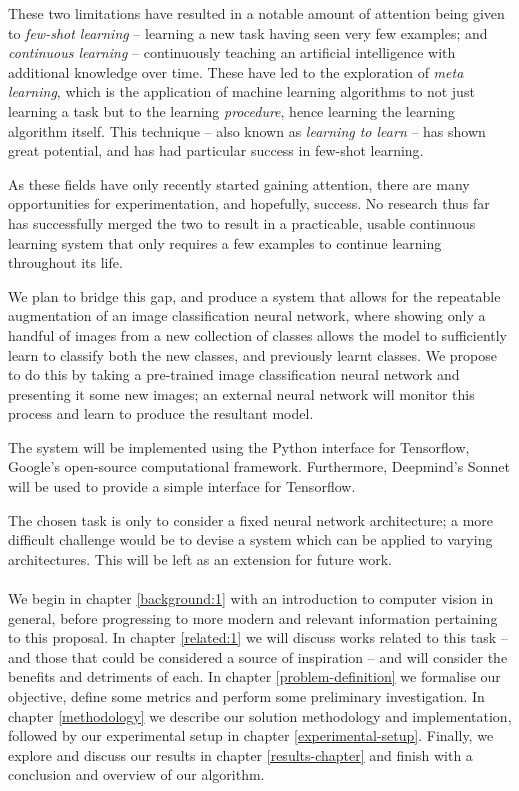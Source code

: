 \documentclass{report}
\begin{document}
These two limitations have resulted in a notable amount of attention being given to \emph{few-shot learning}\parencite{maml}\parencite{relationnet} -- learning a new task having seen very few examples; and  \emph{continuous learning}\parencite{lwf}\parencite{ewc}\parencite{hat} -- continuously teaching an artificial intelligence with additional knowledge over time. These have led to the exploration of \emph{meta learning}\parencite{lotsag}\parencite{maml}\parencite{reptile}\parencite{mlwtc}, which is the application of machine learning algorithms to not just learning a task but to the learning \emph{procedure}, hence learning the learning algorithm itself. This technique -- also known as \emph{learning to learn} -- has shown great potential, and has had particular success in few-shot learning\parencite{maml}\parencite{matching}\parencite{mlwtc}. \par
As these fields have only recently started gaining attention, there are many opportunities for experimentation, and hopefully, success. No research thus far has successfully merged the two to result in a practicable, usable continuous learning system that only requires a few examples to continue learning throughout its life. \par
We plan to bridge this gap, and produce a system that allows for the repeatable augmentation of an image classification neural network, where showing only a handful of images from a new collection of classes allows the model to sufficiently learn to classify both the new classes, and previously learnt classes. We propose to do this by taking a pre-trained image classification neural network and presenting it some new images; an external neural network will monitor this process and learn to produce the resultant model. \par
The system will be implemented using the Python interface for Tensorflow\parencite{tensorflow}, Google's open-source computational framework. Furthermore, Deepmind's Sonnet\parencite{sonnet} will be used to provide a simple interface for Tensorflow. \par
The chosen task is only to consider a fixed neural network architecture; a more difficult challenge would be to devise a system which can be applied to varying architectures. This will be left as an extension for future work. \\ \\
We begin in chapter \ref{background:1} with an introduction to computer vision in general, before progressing to more modern and relevant information pertaining to this proposal. In chapter \ref{related:1} we will discuss works related to this task -- and those that could be considered a source of inspiration -- and will consider the benefits and detriments of each. In chapter \ref{problem-definition} we formalise our objective, define some metrics and perform some preliminary investigation. In chapter \ref{methodology} we describe our solution methodology and implementation, followed by our experimental setup in chapter \ref{experimental-setup}. Finally, we explore and discuss our results in chapter \ref{results-chapter} and finish with a conclusion and overview of our algorithm. \par
\end{document}
